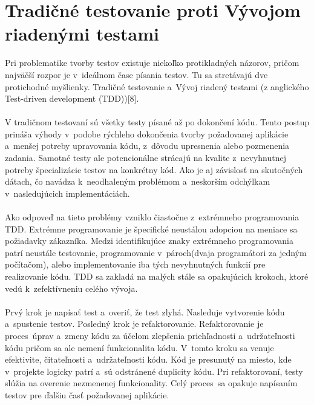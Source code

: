 \documentclass[
  digital, %
  table,   %
oneside,
  nolof,     %
  nolot,     %
]{fithesis3}
\begin{document}
\section{Tradičné testovanie proti Vývojom riadenými testami}
Pri problematike tvorby testov existuje niekoľko protikladných názorov, pričom najväčší rozpor je v~ideálnom čase písania testov. Tu sa stretávajú dve protichodné myšlienky. Tradičné testovanie a~Vývoj riadený testami (z anglického  Test-driven development (TDD))[8]. \paragraph{}
V tradičnom testovaní sú všetky testy písané až po dokončení kódu. Tento postup prináša výhody v~podobe rýchleho dokončenia tvorby požadovanej aplikácie a~menšej potreby upravovania kódu, z~dôvodu upresnenia alebo pozmenenia zadania. Samotné testy ale potencionálne strácajú na kvalite z~nevyhnutnej  potreby špecializácie testov na konkrétny kód. Ako je aj závislosť na skutočných dátach, čo navádza k~neodhaleným problémom a~neskorším odchýlkam v~nasledujúcich implementáciách.\paragraph{}
Ako odpoveď na tieto problémy vzniklo čiastočne z~extrémneho programovania TDD. Extrémne programovanie je špecifické neustálou adopciou na meniace sa požiadavky zákazníka. Medzi identifikujúce znaky extrémneho programovania patrí neustále testovanie, programovanie v~pároch(dvaja programátori za jedným počítačom), alebo implementovanie  iba tých nevyhnutných funkcií pre realizovanie kódu. TDD sa zakladá na malých stále sa opakujúcich krokoch, ktoré vedú k~zefektívneniu celého vývoja. \paragraph{}
Prvý krok je napísať test a~overiť, že test zlyhá. Nasleduje vytvorenie kódu a~spustenie testov. Posledný krok je refaktorovanie. Refaktorovanie je proces~úprav a~zmeny kódu za účelom zlepšenia priehľadnosti a~udržateľnosti kódu pričom sa ale nemení funkcionalita kódu. V~tomto kroku sa venuje efektivite, čitateľnosti a~udržateľnosti kódu. Kód je presunutý na miesto, kde v~projekte logicky patrí a~sú odstránené duplicity kódu. Pri refaktorovaní, testy slúžia na overenie nezmenenej funkcionality. Celý proces~sa opakuje napísaním testov pre ďalšiu časť požadovanej aplikácie.
\end{document}
